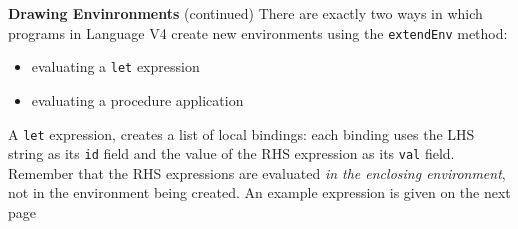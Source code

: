 \begin{minipage}[t]{\sw}
\slidenumber
\LARGE
{\bf Drawing Envinronments} (continued)\exx
There are exactly two ways in which programs
in Language V4 create new environments
using the \verb'extendEnv' method:
\begin{itemize}
\itemsep 0in
\item evaluating a \verb'let' expression
\item evaluating a procedure application
\end{itemize}
A \verb'let' expression,
creates a list of local bindings:
each binding uses the LHS string as its \verb'id' field
and the value of the RHS expression as its \verb'val' field.
Remember that the RHS expressions are evaluated
{\em in the enclosing environment},
not in the environment being created.
An example expression is given on the next page
\end{minipage}
\clearpage
